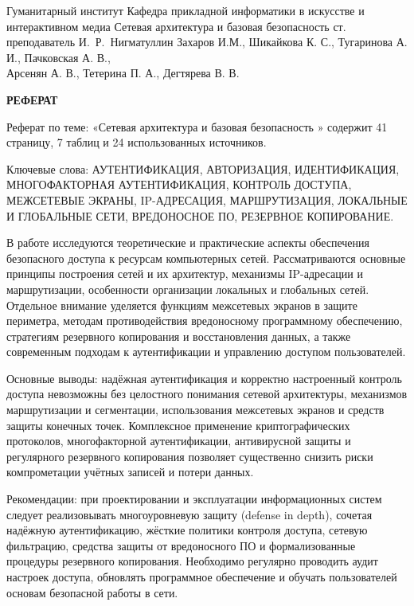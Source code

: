 \documentclass{SibFU-docs}
\begin{document}
\renewcommand{\contentsname}{}
\mycovertitle
{Гуманитарный институт}
{Кафедра прикладной информатики в искусстве и интерактивном медиа}
{Сетевая архитектура и базовая безопасность }
{ст. преподаватель И.~Р.~Нигматуллин}
{Захаров И.М., Шикайкова К. С., Тугаринова А. И., Пачковская А. В.,\\
Арсенян А. В., Тетерина П. А., Дегтярева В. В.}
 
\begin{center}
\bfseries РЕФЕРАТ
\end{center}
\noindent

Реферат по теме: «Сетевая архитектура и базовая безопасность » содержит 41 страницу, 7 таблиц и 24 использованных источников.

Ключевые слова: АУТЕНТИФИКАЦИЯ, АВТОРИЗАЦИЯ, ИДЕНТИФИКАЦИЯ, МНОГОФАКТОРНАЯ АУТЕНТИФИКАЦИЯ, КОНТРОЛЬ ДОСТУПА, МЕЖСЕТЕВЫЕ ЭКРАНЫ, IP-АДРЕСАЦИЯ, МАРШРУТИЗАЦИЯ, ЛОКАЛЬНЫЕ И ГЛОБАЛЬНЫЕ СЕТИ, ВРЕДОНОСНОЕ ПО, РЕЗЕРВНОЕ КОПИРОВАНИЕ.

В работе исследуются теоретические и практические аспекты обеспечения безопасного доступа к ресурсам компьютерных сетей. Рассматриваются основные принципы построения сетей и их архитектур, механизмы IP-адресации и маршрутизации, особенности организации локальных и глобальных сетей. Отдельное внимание уделяется функциям межсетевых экранов в защите периметра, методам противодействия вредоносному программному обеспечению, стратегиям резервного копирования и восстановления данных, а также современным подходам к аутентификации и управлению доступом пользователей.

Основные выводы: надёжная аутентификация и корректно настроенный контроль доступа невозможны без целостного понимания сетевой архитектуры, механизмов маршрутизации и сегментации, использования межсетевых экранов и средств защиты конечных точек. Комплексное применение криптографических протоколов, многофакторной аутентификации, антивирусной защиты и регулярного резервного копирования позволяет существенно снизить риски компрометации учётных записей и потери данных.

Рекомендации: при проектировании и эксплуатации информационных систем следует реализовывать многоуровневую защиту (defense in depth), сочетая надёжную аутентификацию, жёсткие политики контроля доступа, сетевую фильтрацию, средства защиты от вредоносного ПО и формализованные процедуры резервного копирования. Необходимо регулярно проводить аудит настроек доступа, обновлять программное обеспечение и обучать пользователей основам безопасной работы в сети.
\end{document}
